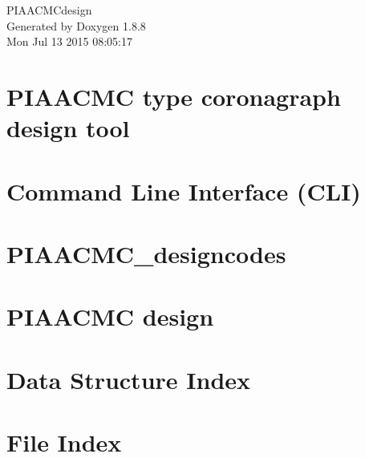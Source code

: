 \documentclass[twoside]{book}
\newcommand{\+}{\discretionary{\mbox{\scriptsize$\hookleftarrow$}}{}{}}
\newcommand{\clearemptydoublepage}{%
  \newpage{\pagestyle{empty}\cleardoublepage}%
}
\begin{document}
\hypersetup{pageanchor=false,
             bookmarks=true,
             bookmarksnumbered=true,
             pdfencoding=unicode
            }
\begin{titlepage}
\vspace*{7cm}
\begin{center}%
{\Large P\+I\+A\+A\+C\+M\+Cdesign }\\
\vspace*{1cm}
{\large Generated by Doxygen 1.8.8}\\
\vspace*{0.5cm}
{\small Mon Jul 13 2015 08:05:17}\\
\end{center}
\end{titlepage}
\clearemptydoublepage
\tableofcontents
\clearemptydoublepage
{}
\hypersetup{pageanchor=true}

\chapter{P\+I\+A\+A\+C\+M\+C type coronagraph design tool}
\label{md_README}
\hypertarget{md_README}{}

\chapter{Command Line Interface (C\+L\+I)}
\label{md_src_CLIcore}
\hypertarget{md_src_CLIcore}{}

\chapter{P\+I\+A\+A\+C\+M\+C\+\_\+designcodes}
\label{md_src_PIAACMCsimul_PIAACMC_designcodes}
\hypertarget{md_src_PIAACMCsimul_PIAACMC_designcodes}{}

\chapter{P\+I\+A\+A\+C\+M\+C design}
\label{md_src_PIAACMCsimul_README}
\hypertarget{md_src_PIAACMCsimul_README}{}

\chapter{Data Structure Index}

\chapter{File Index}

\end{document}
